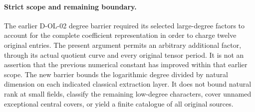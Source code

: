 \paragraph{Strict scope and remaining boundary.}
The earlier D-OL-02 degree barrier required its selected large-degree
factors to account for the complete coefficient representation in
order to charge twelve original entries. The present argument permits
an arbitrary additional factor, through its actual quotient curve
and every original tensor period. It is not an assertion that the
previous numerical constant has improved within that earlier scope.
The new barrier bounds the logarithmic degree divided by natural
dimension on each indicated classical extraction layer. It does
not bound natural rank at small fields, classify the remaining
low-degree characters, cover unnamed exceptional central covers,
or yield a finite catalogue of all original sources.
